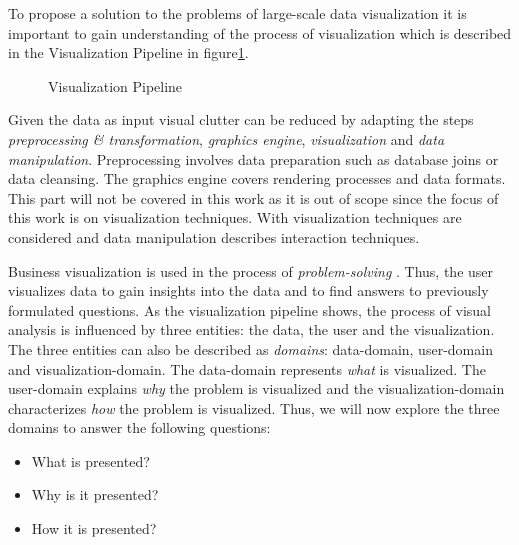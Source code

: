 \par
To propose a solution to the problems of large-scale data visualization it is important to gain understanding of the process of visualization which is described in the Visualization Pipeline in figure\ref{fig:vispipeline}. 
\begin{figure}[H]
    \centering
    \caption{Visualization Pipeline}
    \label{fig:vispipeline}
\end{figure}
Given the data as input visual clutter can be reduced by adapting the steps \textit{preprocessing \& transformation}, \textit{graphics engine}, \textit{visualization} and \textit{data manipulation}. Preprocessing involves data preparation such as database joins or data cleansing. The graphics engine covers rendering processes and data formats. This part will not be covered in this work as it is out of scope since the focus of this work is on visualization techniques. With visualization techniques are considered and data manipulation describes interaction techniques.  

Business visualization is used in the process of \textit{problem-solving}  \cite{Bacic2012}. Thus, the user visualizes data to gain insights into the data and to find answers to previously formulated questions.  
As the visualization pipeline shows, the process of visual analysis is influenced by three entities: the data, the user and the visualization.
The three entities can also be described as \textit{domains}: data-domain, user-domain and visualization-domain. The data-domain represents \textit{what} is visualized. The user-domain explains \textit{why} the problem is visualized and the visualization-domain characterizes \textit{how} the problem is visualized. Thus, we will now explore the three domains to answer the following questions: 

\begin{itemize}
    \item What is presented?
    \item Why is it presented?
    \item How it is presented?
\end{itemize}


